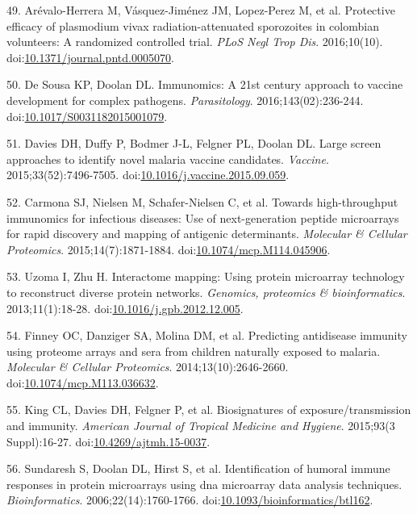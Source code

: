 \documentclass[]{article}
\begin{document}
\hypertarget{ref-arevalo2016spz}{}
49. Arévalo-Herrera M, Vásquez-Jiménez JM, Lopez-Perez M, et al.
Protective efficacy of plasmodium vivax radiation-attenuated sporozoites
in colombian volunteers: A randomized controlled trial. \emph{PLoS Negl
Trop Dis}. 2016;10(10).
doi:\href{https://doi.org/10.1371/journal.pntd.0005070}{10.1371/journal.pntd.0005070}.

\hypertarget{ref-immunomics2016}{}
50. De Sousa KP, Doolan DL. Immunomics: A 21st century approach to
vaccine development for complex pathogens. \emph{Parasitology}.
2016;143(02):236-244.
doi:\href{https://doi.org/10.1017/S0031182015001079}{10.1017/S0031182015001079}.

\hypertarget{ref-Davies2015Large}{}
51. Davies DH, Duffy P, Bodmer J-L, Felgner PL, Doolan DL. Large screen
approaches to identify novel malaria vaccine candidates. \emph{Vaccine}.
2015;33(52):7496-7505.
doi:\href{https://doi.org/10.1016/j.vaccine.2015.09.059}{10.1016/j.vaccine.2015.09.059}.

\hypertarget{ref-carmona2015peptide}{}
52. Carmona SJ, Nielsen M, Schafer-Nielsen C, et al. Towards
high-throughput immunomics for infectious diseases: Use of
next-generation peptide microarrays for rapid discovery and mapping of
antigenic determinants. \emph{Molecular \& Cellular Proteomics}.
2015;14(7):1871-1884.
doi:\href{https://doi.org/10.1074/mcp.M114.045906}{10.1074/mcp.M114.045906}.

\hypertarget{ref-uzoma2013interactome}{}
53. Uzoma I, Zhu H. Interactome mapping: Using protein microarray
technology to reconstruct diverse protein networks. \emph{Genomics,
proteomics \& bioinformatics}. 2013;11(1):18-28.
doi:\href{https://doi.org/10.1016/j.gpb.2012.12.005}{10.1016/j.gpb.2012.12.005}.

\hypertarget{ref-Finney2014}{}
54. Finney OC, Danziger SA, Molina DM, et al. Predicting antidisease
immunity using proteome arrays and sera from children naturally exposed
to malaria. \emph{Molecular \& Cellular Proteomics}.
2014;13(10):2646-2660.
doi:\href{https://doi.org/10.1074/mcp.M113.036632}{10.1074/mcp.M113.036632}.

\hypertarget{ref-King2015FOC}{}
55. King CL, Davies DH, Felgner P, et al. Biosignatures of
exposure/transmission and immunity. \emph{American Journal of Tropical
Medicine and Hygiene}. 2015;93(3 Suppl):16-27.
doi:\href{https://doi.org/10.4269/ajtmh.15-0037}{10.4269/ajtmh.15-0037}.

\hypertarget{ref-sundaresh2006}{}
56. Sundaresh S, Doolan DL, Hirst S, et al. Identification of humoral
immune responses in protein microarrays using dna microarray data
analysis techniques. \emph{Bioinformatics}. 2006;22(14):1760-1766.
doi:\href{https://doi.org/10.1093/bioinformatics/btl162}{10.1093/bioinformatics/btl162}.
\end{document}
